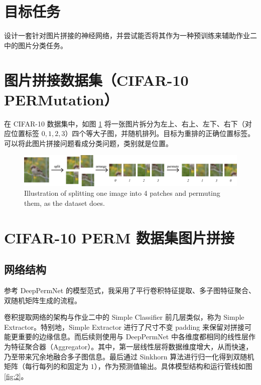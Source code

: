 \documentclass[a4paper]{article}
\begin{document}
\section{目标任务}
    设计一套针对图片拼接的神经网络，并尝试能否将其作为一种预训练来辅助作业二中的图片分类任务。

\section{图片拼接数据集（CIFAR-10 PERMutation）}
在 CIFAR-10 数据集中，如图 \ref{fig:1} 将一张图片拆分为左上、右上、左下、右下（对应位置标签 $0, 1, 2, 3$）四个等大子图，并随机排列。目标为重排的正确位置标签。可以将此图片拼接问题看成分类问题，类别就是位置。

\begin{figure}[H]
    \centering
    \includegraphics[width=0.95\linewidth]{images/data.eps}
    
    \caption{Illustration of splitting one image into 4 patches and permuting them, as the dataset does.}
    \label{fig:1}
\end{figure}

\section{CIFAR-10 PERM 数据集图片拼接}
\subsection{网络结构}
参考 DeepPermNet \cite{deeppermnet} 的模型范式，我采用了平行卷积特征提取、多子图特征聚合、双随机矩阵生成的流程。

卷积提取网络的架构与作业二中的 Simple Classifier 前几层类似，称为 Simple Extractor。特别地，Simple Extractor 进行了尺寸不变 padding 来保留对拼接可能更重要的边缘信息。而后续则使用与 DeepPermNet 中各维度都相同的线性层作为特征聚合器（Aggregator）。其中，第一层线性层将数据维度增大，从而快速，乃至带来冗余地融合多子图信息。最后通过 Sinkhorn \cite{sinkhorn1, sinkhorn2} 算法进行归一化得到双随机矩阵（每行每列的和固定为 $1$），作为预测值输出。具体模型结构和运行管线如图 \ref{fig:2}。
\end{document}
